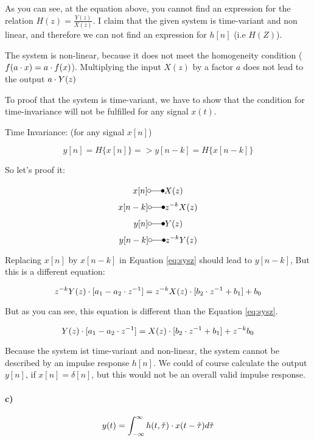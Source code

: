 As you can see, at the equation above, you cannot find an expression for the relation
$H(z) = \frac{Y(z)}{X(z)}$. I claim that the given system is time-variant and non linear, and therefore we can not
find an expression for $h[n]$ (i.e $H(Z)$).

The system is non-linear, because it does not meet the homogeneity condition ($f(a \cdot x) = a \cdot f(x)$).
Multiplying the input $X(z)$ by a factor $a$ does not lead to the output $a \cdot Y(z)$

To proof that the system is time-variant, we have to show that the condition
for time-invariance will not be fulfilled for any signal $x(t)$.

Time Invariance: (for any signal $x[n]$)

\begin{equation}
 y[n] = H\{x[n]\} => y[n-k] = H\{x[n-k]\}
\end{equation}

So let's proof it:

$$x[n] \laplace X(z)$$
$$x[n-k] \laplace z^{-k} X(z)$$
$$y[n] \laplace Y(z)$$
$$y[n-k] \laplace z^{-k} Y(z)$$

Replacing $x[n]$ by $x[n-k]$ in Equation \ref{eq:sysz} should lead to $y[n-k]$,
But this is a different equation:

\begin{equation}
z^{-k}Y(z) \cdot [a_1 - a_2 \cdot z^{-1}]= z^{-k}X(z) \cdot [b_2 \cdot z^{-1} + b_1] + b_0
\end{equation}

But as you can see, this equation is different than the Equation \ref{eq:sysz}.

\begin{equation}
Y(z) \cdot [a_1 - a_2 \cdot z^{-1}]= X(z) \cdot [b_2 \cdot z^{-1} + b_1] + z^{-k}b_0
\end{equation}


Because the system ist time-variant and non-linear, the system cannot be described by an impulse
response $h[n]$. We could of course calculate the output $y[n]$, if $x[n] = \delta[n]$, but
this would not be an overall valid impulse response.

\paragraph{c)}

\begin{equation}
 y(t) = \int_{-\infty}^{\infty} h(t,\hat{\tau}) \cdot x(t-\hat{\tau}) d\hat{\tau}
\end{equation}

